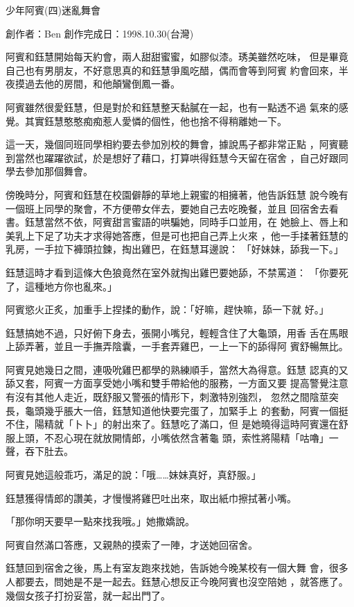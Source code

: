 



少年阿賓(四)迷亂舞會

創作者：Ben
創作完成日：1998.10.30(台灣)


阿賓和鈺慧開始每天約會，兩人甜甜蜜蜜，如膠似漆。琇美雖然吃味，
但是畢竟自己也有男朋友，不好意思真的和鈺慧爭風吃醋，偶而會等到阿賓
約會回來，半夜摸過去他的房間，和他顛鸞倒鳳一番。

阿賓雖然很愛鈺慧，但是對於和鈺慧整天黏膩在一起，也有一點透不過
氣來的感覺。其實鈺慧憨憨痴痴惹人愛憐的個性，他也捨不得稍離她一下。

這一天，幾個同班同學相約要去參加別校的舞會，據說馬子都非常正點
，阿賓聽到當然也躍躍欲試，於是想好了藉口，打算哄得鈺慧今天留在宿舍
，自己好跟同學去參加那個舞會。

傍晚時分，阿賓和鈺慧在校園僻靜的草地上親蜜的相擁著，他告訴鈺慧
說今晚有一個班上同學的聚會，不方便帶女伴去，要她自己去吃晚餐，並且
回宿舍去看書。鈺慧當然不依，阿賓甜言蜜語的哄騙她，同時手口並用，在
她臉上、唇上和美乳上下足了功夫才求得她答應，但是可也把自己弄上火來
，他一手揉著鈺慧的乳房，一手拉下褲頭拉鍊，掏出雞巴，在鈺慧耳邊說：
「好妹妹，舔我一下。」

鈺慧這時才看到這條大色狼竟然在室外就掏出雞巴要她舔，不禁罵道：
「你要死了，這種地方你也亂來。」

阿賓慾火正炙，加重手上捏揉的動作，說：「好嘛，趕快嘛，舔一下就
好。」

鈺慧搞她不過，只好俯下身去，張開小嘴兒，輕輕含住了大龜頭，用香
舌在馬眼上舔弄著，並且一手撫弄陰囊，一手套弄雞巴，一上一下的舔得阿
賓舒暢無比。

阿賓見她幾日之間，連吸吮雞巴都學的熟練順手，當然大為得意。鈺慧
認真的又舔又套，阿賓一方面享受她小嘴和雙手帶給他的服務，一方面又要
提高警覺注意有沒有其他人走近，既舒服又警張的情形下，刺激特別強烈，
忽然之間陰莖突長，龜頭幾乎脹大一倍，鈺慧知道他快要完蛋了，加緊手上
的套動，阿賓一個挺不住，陽精就「卜卜」的射出來了。鈺慧吃了滿口，但
是她曉得這時阿賓還在舒服上頭，不忍心現在就放開情郎，小嘴依然含著龜
頭，索性將陽精「咕嚕」一聲，吞下肚去。

阿賓見她這般乖巧，滿足的說：「哦……妹妹真好，真舒服。」

鈺慧獲得情郎的讚美，才慢慢將雞巴吐出來，取出紙巾擦拭著小嘴。

「那你明天要早一點來找我哦。」她撒嬌說。

阿賓自然滿口答應，又親熱的摸索了一陣，才送她回宿舍。

鈺慧回到宿舍之後，馬上有室友跑來找她，告訴她今晚某校有一個大舞
會，很多人都要去，問她是不是一起去。鈺慧心想反正今晚阿賓也沒空陪她
，就答應了。幾個女孩子打扮妥當，就一起出門了。

